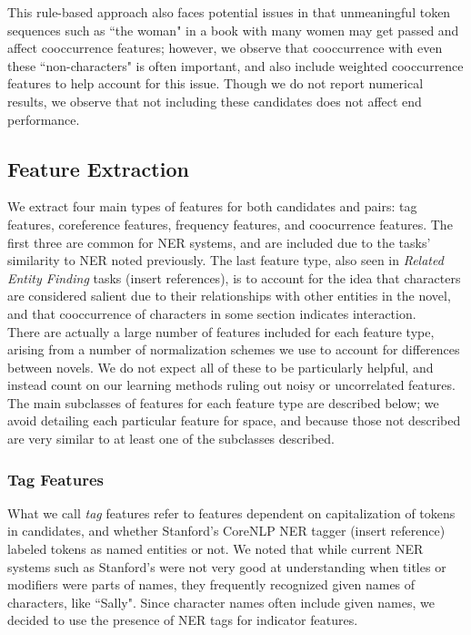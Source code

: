 \documentclass[12pt]{article}
\begin{document}
        This rule-based approach also faces potential issues in that unmeaningful token sequences such as
        ``the woman" in a book with many women may get passed and affect cooccurrence features; however,
        we observe that cooccurrence with even these ``non-characters" is often important, and also
        include weighted cooccurrence features to help account for this issue. Though we do not
        report numerical results, we observe that not including these candidates does not affect 
        end performance.

    \subsection{Feature Extraction}

        We extract four main types of features for both candidates and pairs: tag features,
        coreference features, frequency features, and coocurrence features. The first three are common
        for NER systems, and are included due to the tasks' similarity to NER noted previously. The last
        feature type, also seen in \emph{Related Entity Finding} tasks (insert references), is to account
        for the idea that characters are considered salient due to their relationships with other
        entities in the novel, and that cooccurrence of characters in some section indicates interaction. \\

        There are actually a large number of features included for each feature type, arising from a number
        of normalization schemes we use to account for differences between novels. We do not expect
        all of these to be particularly helpful, and instead count on our learning methods ruling out
        noisy or uncorrelated features. The main subclasses of features for each feature type 
        are described below; we avoid detailing each particular feature for space, and because
        those not described are very similar to at least one of the subclasses described.

        \subsubsection{Tag Features}
        
        What we call \emph{tag} features refer to features dependent on capitalization of tokens in
        candidates, and whether Stanford's CoreNLP NER tagger (insert reference) labeled tokens as 
        named entities or not. We noted that while current NER systems such as Stanford's were
        not very good at understanding when titles or modifiers were parts of names, they frequently
        recognized given names of characters, like ``Sally". Since character names often 
        include given names, we decided to use the presence of NER tags for indicator features. \\
\end{document}
